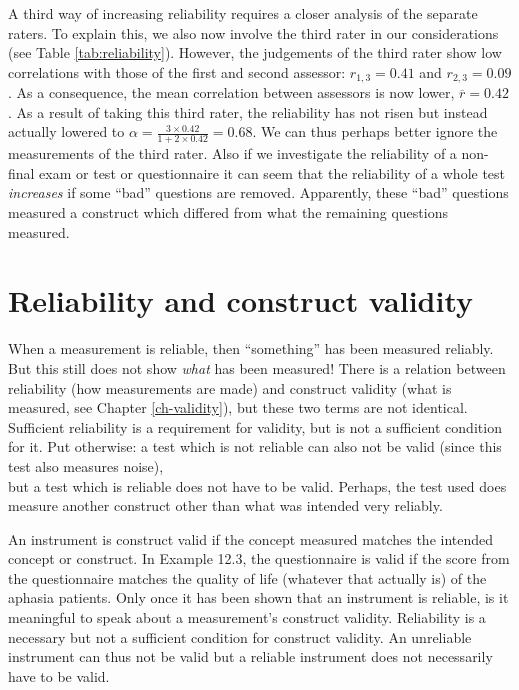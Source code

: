 \documentclass[
]{book}
\begin{document}
A third way of increasing reliability requires a closer analysis of
the separate raters. To explain this, we also now involve the third
rater in our considerations (see Table
\ref{tab:reliability}). However, the judgements of the third rater show
low correlations with those of the first and second
assessor: \(r_{1,3}=0.41\) and \(r_{2,3}=0.09\). As a consequence, the mean
correlation between assessors is now lower,
\(\overline{r}=0.42\). As a result of taking this third rater, the reliability
has not risen but instead actually lowered to
\(\alpha = \frac{3\times0.42}{1+2\times0.42} = 0.68\). We can thus
perhaps better ignore the measurements of the third rater.
Also if we investigate the reliability of a non-final exam or test or questionnaire
it can seem that the reliability of a whole test \emph{increases} if some
``bad'' questions are removed. Apparently, these ``bad'' questions measured
a construct which differed from what the remaining questions measured.

\hypertarget{reliability-and-construct-validity}{%
\section{Reliability and construct validity}\label{reliability-and-construct-validity}}

When a measurement is reliable, then ``something'' has been measured reliably.
But this still does not show \emph{what} has been measured! There is a
relation between reliability (how measurements are made) and construct
validity (what is measured, see
Chapter \ref{ch-validity}), but these two terms are not identical.
Sufficient reliability is a requirement for validity, but
is not a sufficient condition for it. Put otherwise: a test which
is not reliable can also not be valid (since this test also measures noise),\\
but a test which is reliable does not have to be valid.
Perhaps, the test used does measure another construct other than what
was intended very reliably.

An instrument is construct valid if the concept measured matches
the intended concept or construct. In
Example 12.3, the questionnaire is valid if the score from
the questionnaire matches the quality of life (whatever that actually
is) of the aphasia patients. Only once it has been shown that
an instrument is reliable, is it meaningful to speak about a measurement's
construct validity. Reliability is a necessary but not a sufficient condition for
construct validity. An unreliable
instrument can thus not be valid but a reliable instrument does not necessarily
have to be valid.
\end{document}
